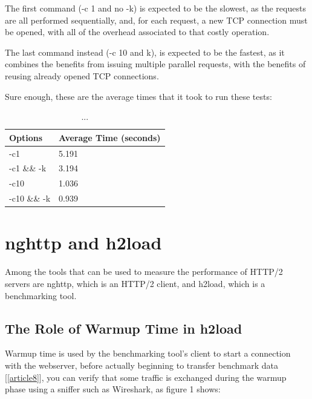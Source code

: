 \documentclass[a4paper,10pt]{article}
\begin{document}
The first command (-c 1 and no -k) is expected to be the slowest, as the requests are all performed sequentially, and, for each request, a new TCP connection must be opened, with all of the overhead associated to that costly operation. 

The last command instead (-c 10 and k), is expected to be the fastest, as it combines the benefits from issuing multiple parallel requests, with the benefits of reusing already opened TCP connections.

Sure enough, these are the average times that it took to run these tests:




\begin{table}[h!]
\centering
\begin{tabular}{|l|l|}
\hline
Options      & Average Time (seconds) \\ \hline
-c1          & 5.191        \\ \hline
-c1 \&\& -k  & 3.194        \\ \hline
-c10         & 1.036        \\ \hline
-c10 \&\& -k & 0.939        \\ \hline



\end{tabular}

\caption{...}
\label{fig:table3}

\end{table}

\clearpage 


\section{nghttp and h2load}
Among the tools that can be used to measure the performance of HTTP/2 servers are nghttp, which is an HTTP/2 client, and h2load, which is a benchmarking tool.

\subsection{The Role of Warmup Time in h2load}

Warmup time is used by the benchmarking tool's client to start a connection with the 
webserver, before actually beginning to transfer benchmark data [\ref{article8}], you can verify that some traffic is exchanged during the warmup phase using a sniffer such as Wireshark, as figure 1 shows: 
\end{document}
